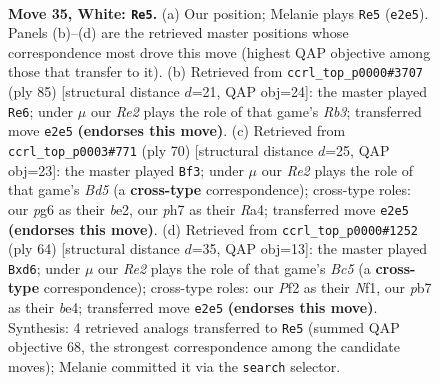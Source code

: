 \documentclass[11pt]{article}
\begin{document}
\clearpage

\begin{figure}[p]\centering
\begin{subfigure}{0.46\textwidth}\centering
\resizebox{\linewidth}{!}{%
\newchessgame
\chessboard[
  setfen={8/pp4kp/6p1/3B4/8/b5P1/4RPKP/3q4 w - - 4 35},
  showmover=false,
  pgfstyle=straightmove, color=movearrow, markmove={e2-e5}
]}
\caption{}
\end{subfigure}\hfill
\begin{subfigure}{0.46\textwidth}\centering
\resizebox{\linewidth}{!}{%
\newchessgame
\chessboard[
  setfen={8/2Q1bpk1/1r4pp/8/5P2/7P/6PK/8 b - - 4 43},
  showmover=false,
  pgfstyle=straightmove, color=movearrow, markmove={b6-e6}
]}
\caption{}
\end{subfigure}
\\[4pt]
\begin{subfigure}{0.46\textwidth}\centering
\resizebox{\linewidth}{!}{%
\newchessgame
\chessboard[
  setfen={8/5pkp/8/2rB1p2/R7/6P1/4bPKP/8 w - - 8 36},
  showmover=false,
  pgfstyle=straightmove, color=movearrow, markmove={d5-f3}
]}
\caption{}
\end{subfigure}\hfill
\begin{subfigure}{0.46\textwidth}\centering
\resizebox{\linewidth}{!}{%
\newchessgame
\chessboard[
  setfen={6k1/5pp1/3p3p/2B5/4b3/2b3P1/5P1P/5NK1 w - - 0 33},
  showmover=false,
  pgfstyle=straightmove, color=movearrow, markmove={c5-d6}
]}
\caption{}
\end{subfigure}
\caption{\textbf{Move 35, White: \texttt{Re5}.} (a) Our position; Melanie plays \texttt{Re5} (\texttt{e2e5}). Panels (b)--(d) are the retrieved master positions whose correspondence most drove this move (highest QAP objective among those that transfer to it). (b) Retrieved from \texttt{ccrl\_top\_p0000\#3707} (ply 85) [structural distance $d$=21, QAP obj=24]: the master played \texttt{Re6}; under $\mu$ our \emph{Re2} plays the role of that game's \emph{Rb3}; transferred move \texttt{e2e5} \textbf{(endorses this move)}. (c) Retrieved from \texttt{ccrl\_top\_p0003\#771} (ply 70) [structural distance $d$=25, QAP obj=23]: the master played \texttt{Bf3}; under $\mu$ our \emph{Re2} plays the role of that game's \emph{Bd5} (a \textbf{cross-type} correspondence); cross-type roles: our \emph{p}g6 as their \emph{b}e2, our \emph{p}h7 as their \emph{R}a4; transferred move \texttt{e2e5} \textbf{(endorses this move)}. (d) Retrieved from \texttt{ccrl\_top\_p0000\#1252} (ply 64) [structural distance $d$=35, QAP obj=13]: the master played \texttt{Bxd6}; under $\mu$ our \emph{Re2} plays the role of that game's \emph{Bc5} (a \textbf{cross-type} correspondence); cross-type roles: our \emph{P}f2 as their \emph{N}f1, our \emph{p}b7 as their \emph{b}e4; transferred move \texttt{e2e5} \textbf{(endorses this move)}. Synthesis: 4 retrieved analogs transferred to \texttt{Re5} (summed QAP objective 68, the strongest correspondence among the candidate moves); Melanie committed it via the \texttt{search} selector.}
\label{fig:thought-m68}
\end{figure}
\end{document}
